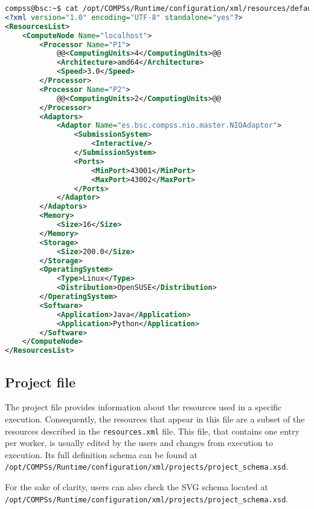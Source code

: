 \begin{lstlisting}[language=xml,moredelim={[is][\textcolor{red}]{@@}{@@}}]
compss@bsc:~$ cat /opt/COMPSs/Runtime/configuration/xml/resources/default_resources.xml
<?xml version="1.0" encoding="UTF-8" standalone="yes"?>
<ResourcesList>
    <ComputeNode Name="localhost">
        <Processor Name="P1">
            @@<ComputingUnits>4</ComputingUnits>@@
            <Architecture>amd64</Architecture>
            <Speed>3.0</Speed>
        </Processor>
        <Processor Name="P2">
            @@<ComputingUnits>2</ComputingUnits>@@
        </Processor>
        <Adaptors>
            <Adaptor Name="es.bsc.compss.nio.master.NIOAdaptor">
                <SubmissionSystem>
                    <Interactive/>
                </SubmissionSystem>
                <Ports>
                    <MinPort>43001</MinPort>
                    <MaxPort>43002</MaxPort>
                </Ports>
            </Adaptor>
        </Adaptors>
        <Memory>
            <Size>16</Size>
        </Memory>
        <Storage>
            <Size>200.0</Size>
        </Storage>
        <OperatingSystem>
            <Type>Linux</Type>
            <Distribution>OpenSUSE</Distribution>
        </OperatingSystem>
        <Software>
            <Application>Java</Application>
            <Application>Python</Application>
        </Software>
    </ComputeNode>
</ResourcesList>
\end{lstlisting}


\subsection{Project file}
The project file provides information about the resources used in a specific execution. Consequently, the resources that 
appear in this file are a subset of the resources described in the \texttt{resources.xml} file. This file, that contains
one entry per worker, is usually edited by the users and changes from execution to execution. Its full definition 
schema can be found at 
\texttt{/opt/COMPSs/Runtime/configuration/xml/projects/project\_schema.xsd}.

For the sake of clarity, users can also check the SVG schema located at \\
\texttt{/opt/COMPSs/Runtime/configuration/xml/projects/project\_schema.xsd}.

